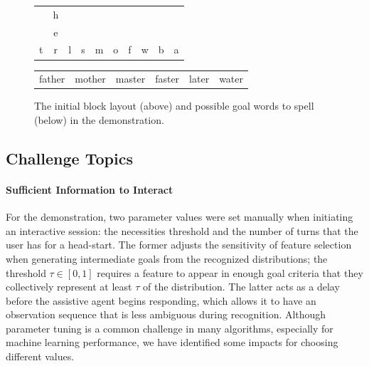 \documentclass[letterpaper]{article} %
\begin{document}
\begin{figure}
\centering
\begin{tabular}{cccccccccc}
& h & & & & & & & &  \\
& e & & & & & & & &  \\
t & r & l & s & m & o & f & w & b & a \\
\hline
\end{tabular}
\begin{tabular}{cccccc}
father & mother & master & faster & later & water \\
\end{tabular}
\caption{The initial block layout (above) and possible goal words to spell (below) in the demonstration.\label{fig:blockwordsDemo}}
\end{figure}

\subsection{Challenge Topics\label{sec:challenges.topics}}
\paragraph{Sufficient Information to Interact} For the demonstration, two parameter values were set manually when initiating an interactive session: the necessities threshold and the number of turns that the user has for a head-start.  The former adjusts the sensitivity of feature selection when generating intermediate goals from the recognized distributions; the threshold $\tau \in [0, 1]$ requires a feature to appear in enough goal criteria that they collectively represent at least $\tau$ of the distribution.  The latter acts as a delay before the assistive agent begins responding, %
 which allows it to have an observation sequence that is less ambiguous during recognition.  Although parameter tuning is a common challenge in many algorithms, especially for machine learning performance, we have identified some impacts for choosing different values.
\end{document}
